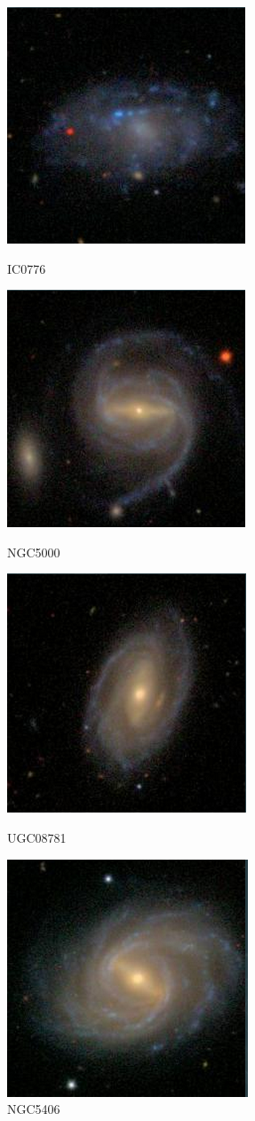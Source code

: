 \documentclass[9pt]{revtex4-1}
\begin{document}
\begin{figure}[h]
\includegraphics[scale=0.3]{IC0776.png}
\caption{IC0776}
\includegraphics[scale=0.3]{NGC5000.png}
\caption{NGC5000}
\includegraphics[scale=0.3]{UGC08781.png}
\caption{UGC08781}
\includegraphics[scale=0.3]{NGC5406.png}
\caption{NGC5406}
\end{figure}
\end{document}
